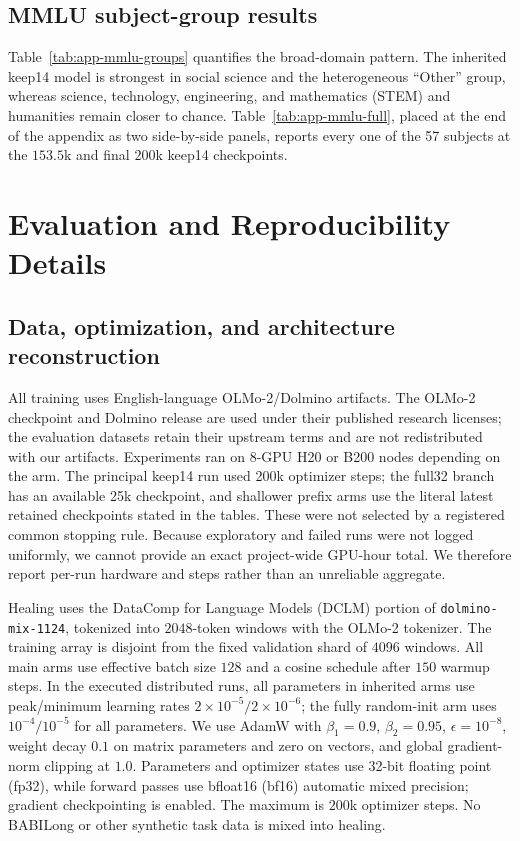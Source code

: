 \subsection{MMLU subject-group results}
\label{app:mmlu-subjects}


Table~\ref{tab:app-mmlu-groups} quantifies the broad-domain pattern. The inherited keep14 model is strongest in
social science and the heterogeneous ``Other'' group, whereas science, technology, engineering, and mathematics (STEM) and humanities
remain closer to chance. Table~\ref{tab:app-mmlu-full}, placed at the
end of the appendix as two side-by-side panels, reports every one of the 57
subjects at the $153.5$k and final $200$k keep14 checkpoints.

\section{Evaluation and Reproducibility Details}
\label{app:repro}

\subsection{Data, optimization, and architecture reconstruction}

All training uses English-language OLMo-2/Dolmino artifacts. The OLMo-2
checkpoint and Dolmino release are used under their published research licenses;
the evaluation datasets retain their upstream terms and are not redistributed
with our artifacts. Experiments ran on 8-GPU H20 or B200 nodes depending on the
arm. The principal keep14 run used 200k optimizer steps; the full32 branch has
an available 25k checkpoint, and shallower prefix arms use the literal latest
retained checkpoints stated in the tables. These were not selected by a
registered common stopping rule. Because exploratory
and failed runs were not logged uniformly, we cannot provide an exact
project-wide GPU-hour total. We therefore report per-run hardware and steps
rather than an unreliable aggregate.

Healing uses the DataComp for Language Models (DCLM) portion of
\texttt{dolmino-mix-1124}, tokenized into $2048$-token windows with the OLMo-2
tokenizer. The training array is disjoint from the fixed validation shard of
$4096$ windows. All main arms use effective batch size $128$ and a cosine
schedule after $150$ warmup steps. In the executed distributed runs, all
parameters in inherited arms use peak/minimum learning rates
$2\times10^{-5}/2\times10^{-6}$; the fully random-init arm uses
$10^{-4}/10^{-5}$ for all parameters. We use AdamW with $\beta_1{=}0.9$,
$\beta_2{=}0.95$, $\epsilon{=}10^{-8}$, weight decay $0.1$ on matrix parameters
and zero on vectors, and global gradient-norm clipping at $1.0$. Parameters and
optimizer states use 32-bit floating point (fp32), while forward passes use
bfloat16 (bf16) automatic mixed precision; gradient checkpointing is enabled.
The maximum is $200$k optimizer steps. No BABILong or other synthetic task data
is mixed into healing.

